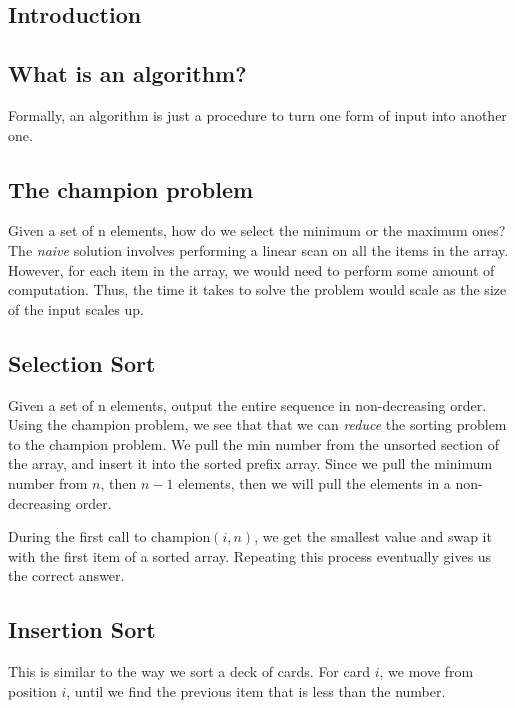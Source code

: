 \documentclass[portrait,10pt, a4paper]{article}
\begin{document}
\raggedright
\begin{multicols*}{3}
\section{Introduction}
\subsection{What is an algorithm?}
Formally, an algorithm is just a procedure to turn one form of input into another one.

\subsection{The champion problem}
		Given a set of n elements, how do we select the minimum or the maximum ones? The \textit{naive}
		solution involves performing a linear scan on all the items in the array. However, for each item in the 
		array, we would need to perform some amount of computation. Thus, the time it takes to solve the problem
		would scale as the size of the input scales up.

\subsection{Selection Sort}	
		Given a set of n elements, output the entire sequence in non-decreasing order. Using the champion problem,
		we see that that we can \textit{reduce} the sorting problem to the champion problem. We pull the min number
		from the unsorted section of the array, and insert it into the sorted prefix array. Since we pull the minimum
		number from $n$, then $n-1$ elements, then we will pull the elements in a non-decreasing order.


		During the first call to $\text{champion}(i,n)$, we get the smallest value and swap it with the first item of a 
		sorted array. Repeating this process eventually gives us the correct answer.
\subsection{Insertion Sort}
		This is similar to the way we sort a deck of cards. For card $i$, we move from position $i$, until we find the 
		previous item that is less than the number.

\end{multicols*}
\end{document}

